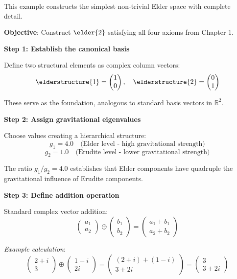 \begin{example}
This example constructs the simplest non-trivial Elder space with complete detail.

\textbf{Objective}: Construct $\elder{2}$ satisfying all four axioms from Chapter 1.

\textbf{Step 1: Establish the canonical basis}

Define two structural elements as complex column vectors:
$$\elderstructure{1} = \begin{pmatrix} 1 \\ 0 \end{pmatrix}, \quad \elderstructure{2} = \begin{pmatrix} 0 \\ 1 \end{pmatrix}$$

These serve as the foundation, analogous to standard basis vectors in $\mathbb{R}^2$.

\textbf{Step 2: Assign gravitational eigenvalues}

Choose values creating a hierarchical structure:
$$g_1 = 4.0 \quad \text{(Elder level - high gravitational strength)}$$
$$g_2 = 1.0 \quad \text{(Erudite level - lower gravitational strength)}$$

The ratio $g_1/g_2 = 4.0$ establishes that Elder components have quadruple the gravitational influence of Erudite components.

\textbf{Step 3: Define addition operation}

Standard complex vector addition:
$$\begin{pmatrix} a_1 \\ a_2 \end{pmatrix} \oplus \begin{pmatrix} b_1 \\ b_2 \end{pmatrix} = \begin{pmatrix} a_1 + b_1 \\ a_2 + b_2 \end{pmatrix}$$

\textit{Example calculation}:
$$\begin{pmatrix} 2+i \\ 3 \end{pmatrix} \oplus \begin{pmatrix} 1-i \\ 2i \end{pmatrix} = \begin{pmatrix} (2+i)+(1-i) \\ 3+2i \end{pmatrix} = \begin{pmatrix} 3 \\ 3+2i \end{pmatrix}$$


\end{example}
